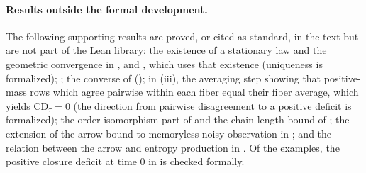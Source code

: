 \paragraph{Results outside the formal development.}
The following supporting results are proved, or cited as standard, in the text but are not part of the Lean library:
the existence of a stationary law and the geometric convergence in , and , which uses that existence (uniqueness is formalized);
;
the converse of \thmNGForceNull{} ();
in \thmNGMacroClosureDeficit(iii), the averaging step showing that positive-mass rows which agree pairwise within each fiber equal their fiber average, which yields $\mathrm{CD}_\tau=0$ (the direction from pairwise disagreement to a positive deficit is formalized);
the order-isomorphism part of  and the chain-length bound of ;
the extension of the arrow bound to memoryless noisy observation in ;
and the relation between the arrow and entropy production in .
Of the examples, the positive closure deficit at time $0$ in  is checked formally.
